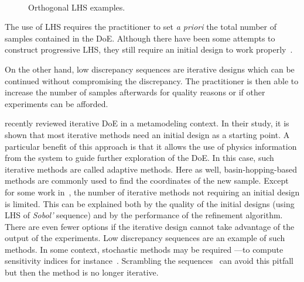 \begin{figure}[!ht]               
\centering
{}
 ~       
\caption{Orthogonal LHS examples.}
\label{fig:lhs}
\end{figure}

\noindent The use of LHS requires the practitioner to set \emph{a priori} the total number of samples contained in the DoE. Although there have been some attempts to construct progressive LHS, they still require an initial design to work properly~\citep{Sheikholeslami2017}.

On the other hand, low discrepancy sequences are iterative designs which can be continued without compromising the discrepancy. The practitioner is then able to increase the number of samples afterwards for quality reasons or if other experiments can be afforded. 

\citet{Liu2018} recently reviewed iterative DoE in a metamodeling context. In their study, it is shown that most iterative methods need an initial design as a starting point. A particular benefit of this approach is that it allows the use of physics information from the system to guide further exploration of the DoE. In this case, such iterative methods are called adaptive methods. Here as well, basin-hopping-based methods are commonly used to find the coordinates of the new sample. Except for some work in~\citep{Crombecq2011}, the number of iterative methods not requiring an initial design is limited. This can be explained both by the quality of the initial designs (using LHS of \emph{Sobol'} sequence) and by the performance of the refinement algorithm. There are even fewer options if the iterative design cannot take advantage of the output of the experiments. Low discrepancy sequences are an example of such methods. In some context, stochastic methods may be required ---\thinspace to compute sensitivity indices for instance~\citep{Saltelli2010}. Scrambling the sequences~\citep{Owen1998} can avoid this pitfall but then the method is no longer iterative.

